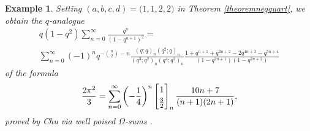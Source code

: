 \documentclass[12pt]{article}
\newtheorem{example}{Example}
\begin{document}
\begin{example}
 Setting $(a, b, c, d) = \big( 1, 1, 2, 2 \big)$ in Theorem \ref{theoremnegquart}, we obtain 
 the $q$-analogue 
\begin{multline*}
 q (1-q^2) 
 \sum_{n=0}^{\infty} 
 \frac{q^n}{(1-q^{n+1})^2} = \\ \sum_{n=0}^{\infty} (-1)^{n} 
 q^{-\binom{n}{2}-n} 
 \frac{ (q;q)_{n} (q^2;q)_{n} }{ (q^3;q^2)_{n} (q^4;q^2)_{n} }
 \frac{1 + q^{n+1} + q^{2n+2} - 2 q^{4n+3} - q^{5n+4}}{ (1-q^{2n+1}) (1-q^{2n+2}) }
\end{multline*}
 of the formula 
\begin{equation}\label{20251q129wwww411qqqqqqqqqqqqq103AM1A}
 \frac{2\pi^2}{3} = 
 \sum_{n = 0}^{\infty} 
 \left( -\frac{1}{4} \right)^{n} \left[ \begin{matrix} 
 1 
 \vspace{1mm} \\ 
 \frac{3}{2} \end{matrix} \right]_{n} \frac{10 n + 7}{(n+1)(2n+1)}, 
\end{equation}
 proved by Chu via well poised $\Omega$-sums \cite[Example 33]{Chu2021Omega}. 
\end{example}
\end{document}
